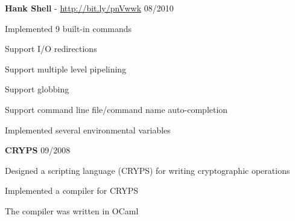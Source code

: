 \documentclass[margin,line]{resume}
\begin{document}
\begin{resume}
    \textbf{Hank Shell} - \url{http://bit.ly/pnVwwk} \hfill 08/2010 \vspace{-3mm}\\\vspace{-1mm}%
      \begin{list2}
       \item Implemented 9 built-in commands
       \item Support I/O redirections
       \item Support multiple level pipelining
       \item Support globbing
       \item Support command line file/command name auto-completion
       \item Implemented several environmental variables
      \end{list2}

    \textbf{CRYPS} \hfill 09/2008 \vspace{-3mm}\\\vspace{-1mm}%
      \begin{list2}
       \item Designed a scripting language (CRYPS) for writing cryptographic operations
       \item Implemented a compiler for CRYPS
       \item The compiler was written in OCaml
      \end{list2}

\end{resume}
\end{document}

